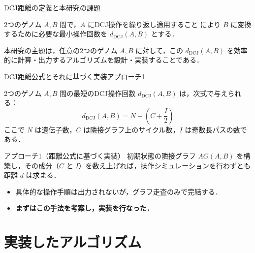 \documentclass[unicode, 11pt, aspectratio=169]{beamer}
\begin{document}

\begin{frame}{DCJ距離の定義と本研究の課題}
    \begin{definition}
        2つのゲノム $A, B$ 間で，$A$ にDCJ操作を繰り返し適用すること
        により $B$ に変換するために必要な最小操作回数を
         $d_{\mathrm{DCJ}}(A,B)$ とする．
    \end{definition}

    \vspace{0.5em}
    本研究の主題は，任意の2つのゲノム $A, B$ に対して，この $d_{\mathrm{DCJ}}(A,B)$ を効率的に計算・出力するアルゴリズムを設計・実装することである．
\end{frame}


\begin{frame}{DCJ距離公式とそれに基づく実装アプローチ1}

    {
    \begin{theorem}
        2つのゲノム $A, B$ 間の最短のDCJ操作回数 $d_{\mathrm{DCJ}}(A,B)$ は，次式で与えられる：
        \[
            d_{\mathrm{DCJ}}(A,B) = N - \left( C + \frac{I}{2} \right)
        \]
        ここで $N$ は遺伝子数，$C$ は隣接グラフ上のサイクル数，$I$ は奇数長パスの数である．
    \end{theorem}
    }
    \begin{block}{アプローチ1（距離公式に基づく実装）}
        初期状態の隣接グラフ $AG(A,B)$ を構築し，その成分（$C$ と $I$）を数え上げれば，操作シミュレーションを行わずとも距離 $d$ は求まる．
    \end{block}

    \begin{itemize}
        \item 具体的な操作手順は出力されないが，グラフ走査のみで完結する．
        \item \textbf{まずはこの手法を考案し，実装を行なった．}
    \end{itemize}
\end{frame}

\section{実装したアルゴリズム}
\end{document}
